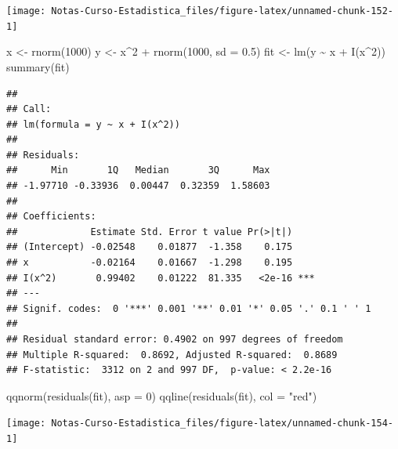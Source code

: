 \documentclass[
  12pt,
]{book}
\newenvironment{Shaded}{\begin{snugshade}}{\end{snugshade}}
\newcommand{\AttributeTok}[1]{\textcolor[rgb]{0.77,0.63,0.00}{#1}}
\newcommand{\DecValTok}[1]{\textcolor[rgb]{0.00,0.00,0.81}{#1}}
\newcommand{\FloatTok}[1]{\textcolor[rgb]{0.00,0.00,0.81}{#1}}
\newcommand{\FunctionTok}[1]{\textcolor[rgb]{0.00,0.00,0.00}{#1}}
\newcommand{\NormalTok}[1]{#1}
\newcommand{\OtherTok}[1]{\textcolor[rgb]{0.56,0.35,0.01}{#1}}
\newcommand{\SpecialCharTok}[1]{\textcolor[rgb]{0.00,0.00,0.00}{#1}}
\newcommand{\StringTok}[1]{\textcolor[rgb]{0.31,0.60,0.02}{#1}}
\begin{document}
\begin{center}\texttt{[image: Notas-Curso-Estadistica\_files/figure-latex/unnamed-chunk-152-1]} \end{center}

\begin{Shaded}
\begin{Highlighting}[]
\NormalTok{x }\OtherTok{\textless{}{-}} \FunctionTok{rnorm}\NormalTok{(}\DecValTok{1000}\NormalTok{)}
\NormalTok{y }\OtherTok{\textless{}{-}}\NormalTok{ x}\SpecialCharTok{\^{}}\DecValTok{2} \SpecialCharTok{+} \FunctionTok{rnorm}\NormalTok{(}\DecValTok{1000}\NormalTok{, }\AttributeTok{sd =} \FloatTok{0.5}\NormalTok{)}
\NormalTok{fit }\OtherTok{\textless{}{-}} \FunctionTok{lm}\NormalTok{(y }\SpecialCharTok{\textasciitilde{}}\NormalTok{ x }\SpecialCharTok{+} \FunctionTok{I}\NormalTok{(x}\SpecialCharTok{\^{}}\DecValTok{2}\NormalTok{))}
\FunctionTok{summary}\NormalTok{(fit)}
\end{Highlighting}
\end{Shaded}

\begin{verbatim}
## 
## Call:
## lm(formula = y ~ x + I(x^2))
## 
## Residuals:
##      Min       1Q   Median       3Q      Max 
## -1.97710 -0.33936  0.00447  0.32359  1.58603 
## 
## Coefficients:
##             Estimate Std. Error t value Pr(>|t|)    
## (Intercept) -0.02548    0.01877  -1.358    0.175    
## x           -0.02164    0.01667  -1.298    0.195    
## I(x^2)       0.99402    0.01222  81.335   <2e-16 ***
## ---
## Signif. codes:  0 '***' 0.001 '**' 0.01 '*' 0.05 '.' 0.1 ' ' 1
## 
## Residual standard error: 0.4902 on 997 degrees of freedom
## Multiple R-squared:  0.8692, Adjusted R-squared:  0.8689 
## F-statistic:  3312 on 2 and 997 DF,  p-value: < 2.2e-16
\end{verbatim}

\begin{Shaded}
\begin{Highlighting}[]
\FunctionTok{qqnorm}\NormalTok{(}\FunctionTok{residuals}\NormalTok{(fit), }\AttributeTok{asp =} \DecValTok{0}\NormalTok{)}
\FunctionTok{qqline}\NormalTok{(}\FunctionTok{residuals}\NormalTok{(fit), }\AttributeTok{col =} \StringTok{"red"}\NormalTok{)}
\end{Highlighting}
\end{Shaded}

\begin{center}\texttt{[image: Notas-Curso-Estadistica\_files/figure-latex/unnamed-chunk-154-1]} \end{center}
\end{document}
